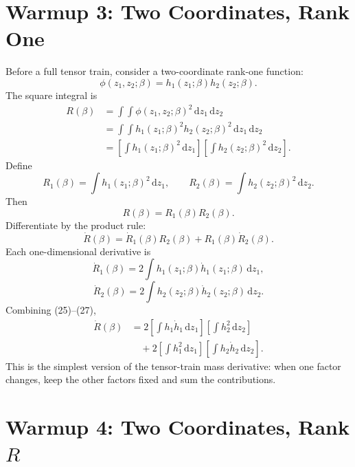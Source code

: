 \documentclass[11pt]{article}
\newcommand{\dd}{\,\mathrm d}
\begin{document}
\section{Warmup 3: Two Coordinates, Rank One}

Before a full tensor train, consider a two-coordinate rank-one function:
\[
    \phi(z_1,z_2;\beta)=h_1(z_1;\beta)h_2(z_2;\beta).
    \tag{P19-21}
\]
The square integral is
\[
\begin{aligned}
    R(\beta)
    &=
    \int\!\!\int
    \phi(z_1,z_2;\beta)^2\dd z_1\dd z_2\\
    &=
    \int\!\!\int
    h_1(z_1;\beta)^2h_2(z_2;\beta)^2\dd z_1\dd z_2\\
    &=
    \left[\int h_1(z_1;\beta)^2\dd z_1\right]
    \left[\int h_2(z_2;\beta)^2\dd z_2\right].
\end{aligned}
\tag{P19-22}
\]
Define
\[
    R_1(\beta)=\int h_1(z_1;\beta)^2\dd z_1,
    \qquad
    R_2(\beta)=\int h_2(z_2;\beta)^2\dd z_2.
    \tag{P19-23}
\]
Then
\[
    R(\beta)=R_1(\beta)R_2(\beta).
    \tag{P19-24}
\]
Differentiate by the product rule:
\[
    \dot R(\beta)=\dot R_1(\beta)R_2(\beta)+R_1(\beta)\dot R_2(\beta).
    \tag{P19-25}
\]
Each one-dimensional derivative is
\[
    \dot R_1(\beta)=2\int h_1(z_1;\beta)\dot h_1(z_1;\beta)\dd z_1,
    \tag{P19-26}
\]
\[
    \dot R_2(\beta)=2\int h_2(z_2;\beta)\dot h_2(z_2;\beta)\dd z_2.
    \tag{P19-27}
\]
Combining (25)--(27),
\[
\begin{aligned}
    \dot R(\beta)
    &=
    2
    \left[\int h_1\dot h_1\dd z_1\right]
    \left[\int h_2^2\dd z_2\right]\\
    &\quad+
    2
    \left[\int h_1^2\dd z_1\right]
    \left[\int h_2\dot h_2\dd z_2\right].
\end{aligned}
\tag{P19-28}
\]
This is the simplest version of the tensor-train mass derivative: when one
factor changes, keep the other factors fixed and sum the contributions.

\section{Warmup 4: Two Coordinates, Rank \texorpdfstring{\(R\)}{R}}
\end{document}
